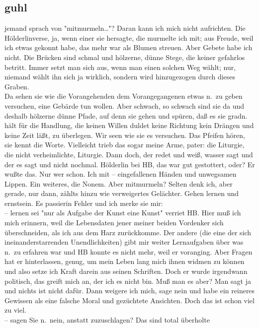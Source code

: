 \documentclass[
]{article}
\author{}
\date{\vspace{-2.5em}}
\begin{document}
\subsection{guhl}\label{guhl}

jemand sprach von "mitmurmeln\ldots"? Daran kann ich mich nicht
aufrichten. Die Hölderlinverse, ja, wenn einer sie hersagte, die
murmelte ich mit; aus Freude, weil ich etwas gekonnt habe, das mehr war
als Blumen streuen. Aber Gebete habe ich nicht. Die Brücken sind schmal
und hölzerne, dünne Stege, die keiner gefahrlos betritt. Immer setzt man
sich aus, wenn man einen solchen Weg wählt; nur, niemand wählt ihn sich
ja wirklich, sondern wird hinzugezogen durch dieses Graben.\\
Da sehen sie wie die Vorangehenden dem Vorangegangenen etwas n.~zu geben
versuchen, eine Gebärde tun wollen. Aber schwach, so schwach sind sie da
und deshalb hölzerne dünne Pfade, auf denn sie gehen und spüren, daß es
sie gradn. hält für die Handlung, die keinen Willen duldet keine
Richtung kein Drängen und keine Zeit läßt, zu überlegen. Wir seen wie
sie es versuchen. Das Pfeifen hören, sie kennt die Worte. Vielleicht
trieb das sogar meine Arme, pater: die Liturgie, die nicht
verheimlichte, Liturgie. Dann doch, der redet und weiß, wasser sagt und
der es sagt und nicht nochmal. Hölderlin bei HB, das war gut gestottert,
oder? Er wußte das. Nur wer schon. Ich mit -- eingefallenen Händen und
unwegsamen Lippen. Ein weiteres, die Nonem. Aber mitmurmeln? Selten denk
ich, aber gerade, nur dann, zählts hinzu wie verweigertes Gelächter.
Gehen lernen und ernstsein. Es passierin Fehler und ich merke sie mir:\\
-- lernen sei "nur als Aufgabe der Kunst eine Kunst" verriet HB. Hier
muß ich mich erinnern, weil die Lebensdaten jener meiner beiden
Vordenker sich überschneiden, als ich aus dem Harz zurückkomme. Der
andere (die eine der sich ineinanderstarrenden Unendlichkeiten) gibt mir
weiter Lernaufgaben über was n.~zu erfahren war und HB konnte es nicht
mehr, weil er voranging. Aber Fragen hat er hinterlassen, genug, um mein
Leben lang mich ihnen widmen zu können und also setze ich Kraft darein
aus seinen Schriften. Doch er wurde irgendwann politisch, das greift
mich an, der ich es nicht bin. Muß man es aber? Man sagt ja und nichts
ist nicht dafür. Dann weigere ich mich, sage nein und habe ein reineres
Gewissen als eine falsche Moral und gezüchtete Ansichten. Doch das ist
schon viel zu viel.\\
-- sagen Sie n.~nein, anstatt zuzuschlagen? Das sind total überholte
\end{document}
